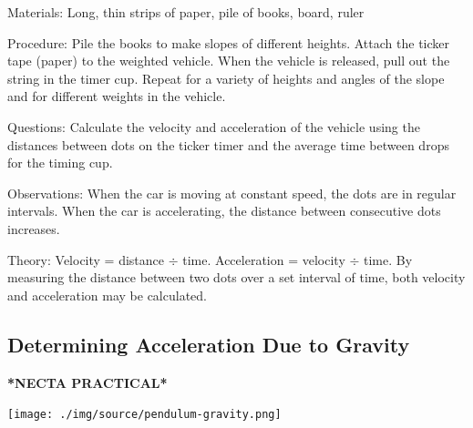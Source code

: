 \begin{multicols}{2}
\begin{description*}
\item[Materials:]{Long, thin strips of paper, pile of books, board, ruler}
\item[Procedure:]{Pile the books to make slopes of different heights. Attach the ticker tape (paper) to the weighted vehicle. When the vehicle is released, pull out the string in the timer cup. Repeat for a variety of heights and angles of the slope and for different weights in the vehicle.}
\item[Questions:]{Calculate the velocity and acceleration of the vehicle using the distances between dots on the ticker timer and the average time between drops for the timing cup.}
\item[Observations:]{When the car is moving at constant speed, the dots are in regular intervals. When the car is accelerating, the distance between consecutive dots increases.}
\item[Theory:]{Velocity = distance $\div$ time. Acceleration = velocity $\div$ time. By measuring the distance between two dots over a set interval of time, both velocity and acceleration may be calculated.}
\end{description*}

\columnbreak

\subsection{Determining Acceleration Due to Gravity}
\textbf{*NECTA PRACTICAL*}

\begin{center}
\texttt{[image: ./img/source/pendulum-gravity.png]}
\end{center}


\end{multicols}
